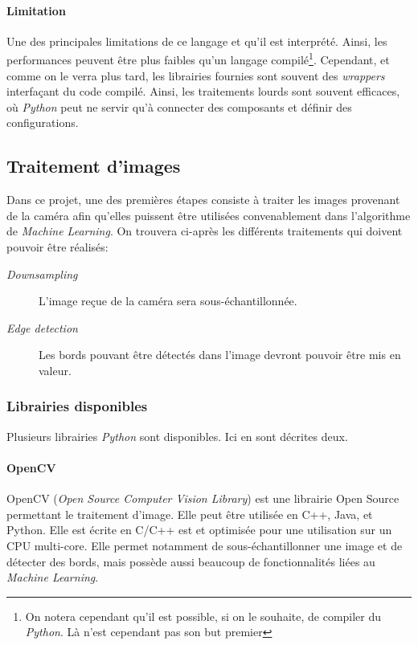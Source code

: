 \paragraph{Limitation}
Une des principales limitations de ce langage et qu'il est interprété. Ainsi, les performances peuvent être plus faibles qu'un langage compilé\footnote{ On notera cependant qu'il est possible, si on le souhaite, de compiler du \textit{Python}. Là n'est cependant pas son but premier}. Cependant, et comme on le verra plus tard, les librairies fournies sont souvent des \textit{wrappers} interfaçant du code compilé. Ainsi, les traitements lourds sont souvent efficaces, où \textit{Python} peut ne servir qu'à connecter des composants et définir des configurations. 

\subsection{Traitement d'images}
Dans ce projet, une des premières étapes consiste à traiter les images provenant de la caméra afin qu'elles puissent être utilisées convenablement dans l'algorithme de \textit{Machine Learning}. On trouvera ci-après les différents traitements qui doivent pouvoir être réalisés:
\begin{description}
    \item[\textit{Downsampling}] L'image reçue de la caméra sera sous-échantillonnée.
    \item[\textit{Edge detection}] Les bords pouvant être détectés dans l'image devront pouvoir être mis en valeur. 
\end{description}

\subsubsection{Librairies disponibles}
Plusieurs librairies \textit{Python} sont disponibles. Ici en sont décrites deux.

\paragraph{OpenCV}
OpenCV\autocite{lib:opencv} (\textit{Open Source Computer Vision Library}) est une librairie Open Source permettant le traitement d'image. Elle peut être utilisée en C++, Java, et Python. Elle est écrite en C/C++ est et optimisée pour une utilisation sur un CPU multi-core. Elle permet notamment de sous-échantillonner une image et de détecter des bords, mais possède aussi beaucoup de fonctionnalités liées au \textit{Machine Learning}.

